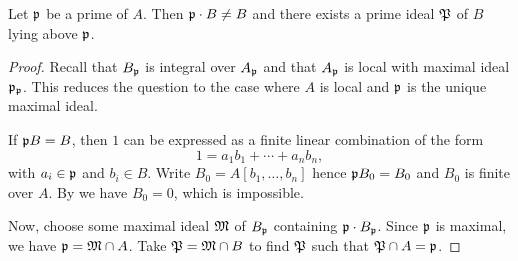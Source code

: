 \begin{proposition}\label{proposition:exists_prime_above}
  Let $\mathfrak{p}$ be a prime of $A$.
  Then $\mathfrak{p} \cdot B \neq B$ and there exists a prime ideal $\mathfrak{P}$ of $B$ lying above $\mathfrak{p}$.
\end{proposition}
\begin{proof}
  Recall that $B_{\mathfrak{p}}$ is integral over $A_{\mathfrak{p}}$ and that $A_{\mathfrak{p}}$ is local with maximal ideal $\mathfrak{p}_{\mathfrak{p}}$.
  This reduces the question to the case where $A$ is local and $\mathfrak{p}$ is the unique maximal ideal.

  If $\mathfrak{p} B = B$, then $1$ can be expressed as a finite linear combination of the form
  \[ 1 = a_{1} b_{1} + \cdots + a_{n} b_{n}, \]
  with $a_{i} \in \mathfrak{p}$ and $b_{i} \in B$.
  Write $B_{0} = A[b_{1},\ldots,b_{n}]$ hence $\mathfrak{p} B_{0} = B_{0}$ and $B_{0}$ is finite over $A$.
  By  we have $B_{0} = 0$, which is impossible.

  Now, choose some maximal ideal $\mathfrak{M}$ of $B_{\mathfrak{p}}$ containing $\mathfrak{p} \cdot B_{\mathfrak{p}}$.
  Since $\mathfrak{p}$ is maximal, we have $\mathfrak{p} = \mathfrak{M} \cap A$.
  Take $\mathfrak{P} = \mathfrak{M} \cap B$ to find $\mathfrak{P}$ such that $\mathfrak{P} \cap A = \mathfrak{p}$.
\end{proof}

